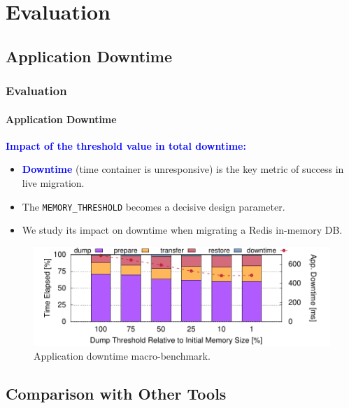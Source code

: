 \documentclass[9pt,    %
    english,            %
    xcolor=table,       %
    envcountsect,        %
    aspectratio=169     %
]{beamer}
\begin{document}
\section{Evaluation}

\subsection{Application Downtime}

\begin{frame}
    \frametitle{Evaluation}
    \framesubtitle{Application Downtime}

    \vspace{10pt}

    \textbf{\textcolor{blue}{Impact of the threshold value in total downtime:}}
    \begin{itemize}
        \item \textcolor{blue}{\textbf{Downtime}} (time container is unresponsive) is the key metric of success in live migration.
        \item The \texttt{MEMORY\_THRESHOLD} becomes a decisive design parameter.
        \item We study its impact on downtime when migrating a Redis in-memory DB.
    \end{itemize}

    \vspace{-5pt}

    \begin{figure}
        \centering
        \includegraphics[width=.75\textwidth]{./figs/downtime.pdf}
        \caption{Application downtime macro-benchmark.\label{fig:diskless-microbecnhmark}}
    \end{figure}
    
\end{frame}

\subsection{Comparison with Other Tools}
\end{document}
